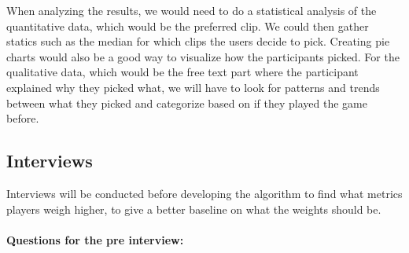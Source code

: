\documentclass[a4paper,twoside]{bth}
\begin{document}
When analyzing the results, we would need to do a statistical analysis of the quantitative data, which would be the preferred clip. We could then gather statics such as the median for which clips the users decide to pick. Creating pie charts would also be a good way to visualize how the participants picked. For the qualitative data, which would be the free text part where the participant explained why they picked what, we will have to look for patterns and trends between what they picked and categorize based on if they played the game before.

\subsection{Interviews}
Interviews will be conducted before developing the algorithm to find what metrics players weigh higher, to give a better baseline on what the weights should be. \\ \\
\textbf {Questions for the pre interview:}\\
\end{document}
